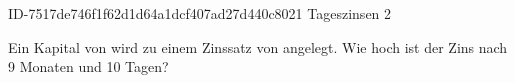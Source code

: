 \begin{exercise}
      {ID-7517de746f1f62d1d64a1dcf407ad27d440c8021}
      {Tageszinsen 2}
  \ifproblem\problem\par
    Ein Kapital von  wird zu einem Zinssatz von  angelegt.
    Wie hoch ist der Zins nach \num{9} Monaten und \num{10} Tagen?
  \fi
\end{exercise}

